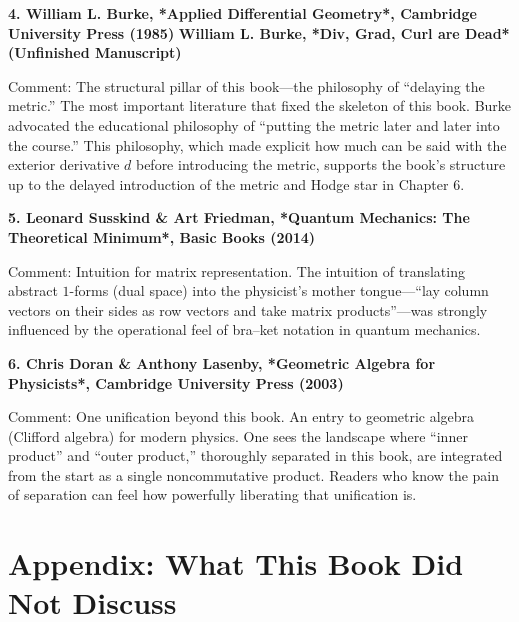 \documentclass[a4paper,12pt,openany]{book}
\begin{document}
\par\vspace{0.35em}\par

\textbf{4. William L. Burke, *Applied Differential Geometry*, Cambridge University Press (1985)}
\textbf{William L. Burke, *Div, Grad, Curl are Dead* (Unfinished Manuscript)}

Comment: The structural pillar of this book—the philosophy of
``delaying the metric.'' The most important literature that fixed the
skeleton of this book. Burke advocated the educational philosophy of
``putting the metric later and later into the course.'' This philosophy,
which made explicit how much can be said with the exterior derivative
\(d\) before introducing the metric, supports the book's structure up to
the delayed introduction of the metric and Hodge star in Chapter 6.

\par\vspace{0.35em}\par

\textbf{5. Leonard Susskind \& Art Friedman, *Quantum Mechanics: The Theoretical Minimum*, Basic Books (2014)}

Comment: Intuition for matrix representation. The intuition of
translating abstract \(1\)-forms (dual space) into the physicist's
mother tongue—``lay column vectors on their sides as row vectors and
take matrix products''—was strongly influenced by the operational feel
of bra–ket notation in quantum mechanics.

\par\vspace{0.35em}\par

\textbf{6. Chris Doran \& Anthony Lasenby, *Geometric Algebra for Physicists*, Cambridge University Press (2003)}

Comment: One unification beyond this book. An entry to geometric algebra
(Clifford algebra) for modern physics. One sees the landscape where
``inner product'' and ``outer product,'' thoroughly separated in this
book, are integrated from the start as a single noncommutative product.
Readers who know the pain of separation can feel how powerfully
liberating that unification is.

\newpage

\hypertarget{appendix-what-this-book-did-not-discuss}{%
\chapter{Appendix: What This Book Did Not
Discuss}\label{appendix-what-this-book-did-not-discuss}}
\end{document}
